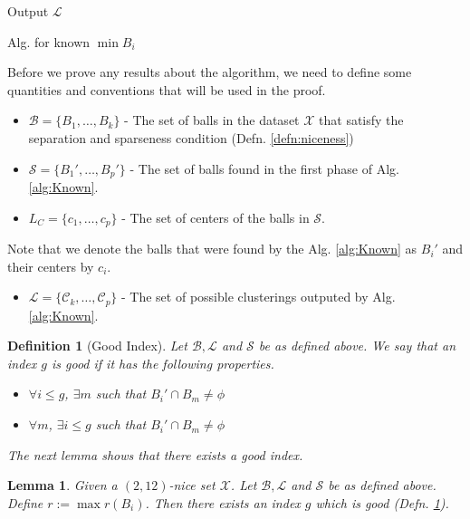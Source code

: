 \documentclass[twoside]{article}
\newcommand{\mc}{\mathcal}
\newtheorem{definition}[theorem]{Definition}
\newtheorem{lemma}[theorem]{Lemma}
\newenvironment{alg}{
    \begin{list}{}{
        \setlength{\itemsep}{2pt}
        \setlength{\parsep}{0pt}
        \setlength{\parskip}{0pt}
        \setlength{\topsep}{1pt}
    }
}
{
    \end{list}
}
\begin{document}
\begin{algorithm}
\begin{alg}
\begin{itemize}
\end{itemize}
\item[] Output $\mc L$ %
\label{alg:Known}
\end{alg}
\caption{Alg. for known $\min{B_i}$}
\end{algorithm}

Before we prove any results about the algorithm, we need to define some quantities and conventions that will be used in the proof.
\begin{itemize}
\item $\mc B = \{B_1, \ldots, B_k\}$ - The set of balls in the dataset $\mc X$ that satisfy the separation and sparseness condition (Defn. \ref{defn:niceness})
\item $\mc S = \{B_1', \ldots, B_p'\}$ - The set of balls found in the first phase of Alg. \ref{alg:Known}. 
\item $L_C = \{c_1, \ldots, c_p\}$ - The set of centers of the balls in $\mc S$.  
\end{itemize}
Note that we denote the balls that were found by the Alg. \ref{alg:Known} as $B_i'$ and their centers by $c_i$. 
\begin{itemize}
\item $\mc L = \{\mc C_k, \ldots, \mc C_p\}$ - The set of possible clusterings outputed by Alg. \ref{alg:Known}. 
\end{itemize}

\begin{definition}[Good Index]
\label{defn:goodIdx}
Let $\mc B, \mc L$ and $\mc S$ be as defined above. We say that an index $g$ is good if it has the following properties.
\begin{itemize}
\item $\forall i \le g$, $\exists m$ such that $B_i' \cap B_m \neq \phi$
\item $\forall m$, $\exists i \le g$ such that $B_i' \cap B_m \neq \phi$
\end{itemize}
The next lemma shows that there exists a good index.
\end{definition}

\begin{lemma}
Given a $(2,12)$-nice set $\mc X$. Let $\mc B, \mc L$ and $\mc S$ be as defined above. Define $r:= \max r(B_i)$. Then there exists an index $g$ which is good (Defn. \ref{defn:goodIdx}).
\label{lemma:goodIdx}
\end{lemma}
\end{document}
